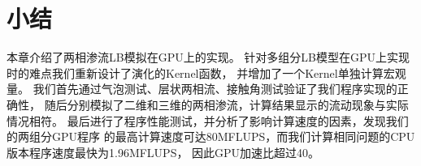
\section{小结}
本章介绍了两相渗流LB模拟在GPU上的实现。
针对多组分LB模型在GPU上实现时的难点我们重新设计了演化的Kernel函数，
并增加了一个Kernel单独计算宏观量。
我们首先通过气泡测试、层状两相流、接触角测试验证了我们程序实现的正确性，
随后分别模拟了二维和三维的两相渗流，计算结果显示的流动现象与实际情况相符。
最后进行了程序性能测试，并分析了影响计算速度的因素，发现我们的两组分GPU程序
的最高计算速度可达80MFLUPS，而我们计算相同问题的CPU版本程序速度最快为1.96MFLUPS，
因此GPU加速比超过40。

